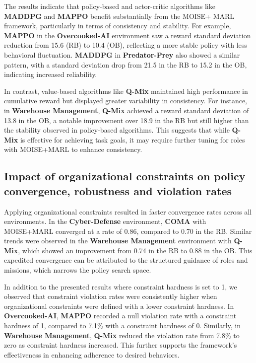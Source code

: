 \documentclass[sigconf]{aamas}
\begin{document}
The results indicate that policy-based and actor-critic algorithms like \textbf{MADDPG} and \textbf{MAPPO} benefit substantially from the MOISE+ MARL framework, particularly in terms of consistency and stability. For example, \textbf{MAPPO} in the \textbf{Overcooked-AI} environment saw a reward standard deviation reduction from 15.6 (RB) to 10.4 (OB), reflecting a more stable policy with less behavioral fluctuation. \textbf{MADDPG} in \textbf{Predator-Prey} also showed a similar pattern, with a standard deviation drop from 21.5 in the RB to 15.2 in the OB, indicating increased reliability.

In contrast, value-based algorithms like \textbf{Q-Mix} maintained high performance in cumulative reward but displayed greater variability in consistency. For instance, in \textbf{Warehouse Management}, \textbf{Q-Mix} achieved a reward standard deviation of 13.8 in the OB, a notable improvement over 18.9 in the RB but still higher than the stability observed in policy-based algorithms. This suggests that while \textbf{Q-Mix} is effective for achieving task goals, it may require further tuning for roles with MOISE+MARL to enhance consistency.

\subsection{Impact of organizational constraints on policy convergence, robustness and violation rates}

Applying organizational constraints resulted in faster convergence rates across all environments. In the \textbf{Cyber-Defense} environment, \textbf{COMA} with MOISE+MARL converged at a rate of 0.86, compared to 0.70 in the RB. Similar trends were observed in the \textbf{Warehouse Management} environment with \textbf{Q-Mix}, which showed an improvement from 0.74 in the RB to 0.88 in the OB. This expedited convergence can be attributed to the structured guidance of roles and missions, which narrows the policy search space.

In addition to the presented results where constraint hardness is set to 1, we observed that constraint violation rates were consistently higher when organizational constraints were defined with a lower constraint hardness. In \textbf{Overcooked-AI}, \textbf{MAPPO} recorded a null violation rate with a constraint hardness of 1, compared to 7.1\% with a constraint hardness of 0. Similarly, in \textbf{Warehouse Management}, \textbf{Q-Mix} reduced the violation rate from 7.8\% to zero as constraint hardness increased. This further supports the framework's effectiveness in enhancing adherence to desired behaviors.
\end{document}
